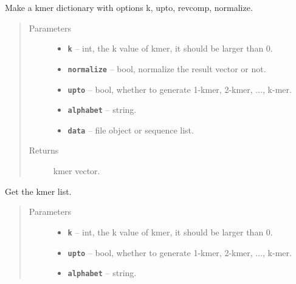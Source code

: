 \documentclass[letterpaper,10pt,english]{sphinxmanual}
\begin{document}
\begin{fulllineitems}
\label{reference/PyDNAnac:PyDNAnac.GetKmer}
Make a kmer dictionary with options k, upto, revcomp, normalize.
\begin{quote}\begin{description}
\item[{Parameters}] \leavevmode\begin{itemize}
\item {} 
\textbf{\texttt{k}} -- int, the k value of kmer, it should be larger than 0.

\item {} 
\textbf{\texttt{normalize}} -- bool, normalize the result vector or not.

\item {} 
\textbf{\texttt{upto}} -- bool, whether to generate 1-kmer, 2-kmer, ..., k-mer.

\item {} 
\textbf{\texttt{alphabet}} -- string.

\item {} 
\textbf{\texttt{data}} -- file object or sequence list.

\end{itemize}

\item[{Returns}] \leavevmode
kmer vector.

\end{description}\end{quote}

\end{fulllineitems}


\begin{fulllineitems}
\label{reference/PyDNAnac:PyDNAnac.GetKmerList}
Get the kmer list.
\begin{quote}\begin{description}
\item[{Parameters}] \leavevmode\begin{itemize}
\item {} 
\textbf{\texttt{k}} -- int, the k value of kmer, it should be larger than 0.

\item {} 
\textbf{\texttt{upto}} -- bool, whether to generate 1-kmer, 2-kmer, ..., k-mer.

\item {} 
\textbf{\texttt{alphabet}} -- string.

\end{itemize}

\end{description}\end{quote}

\end{fulllineitems}
\end{document}
